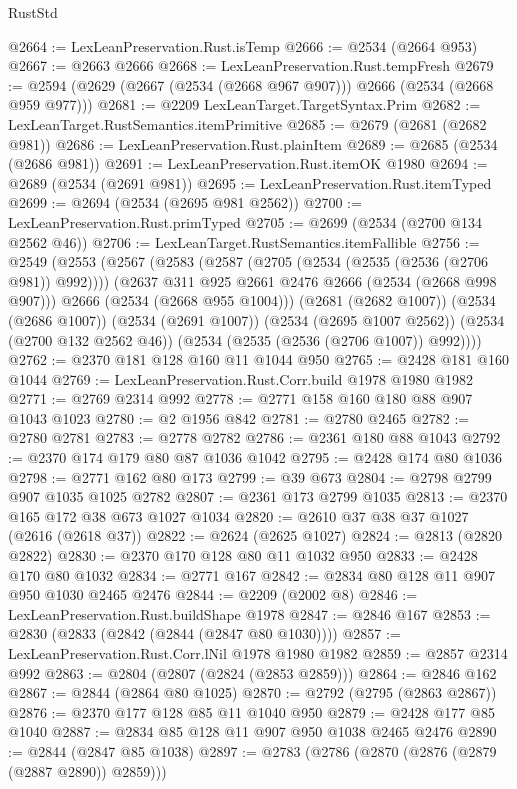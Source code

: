 \begin{lexlean}{RustStd}
\begin{coremodule}
@2664 := LexLeanPreservation.Rust.isTemp
@2666 := @2534 (@2664 @953)
@2667 := @2663 @2666
@2668 := LexLeanPreservation.Rust.tempFresh
@2679 := @2594 (@2629 (@2667 (@2534 (@2668 @967 @907))) @2666 (@2534 (@2668 @959 @977)))
@2681 := @2209 LexLeanTarget.TargetSyntax.Prim
@2682 := LexLeanTarget.RustSemantics.itemPrimitive
@2685 := @2679 (@2681 (@2682 @981))
@2686 := LexLeanPreservation.Rust.plainItem
@2689 := @2685 (@2534 (@2686 @981))
@2691 := LexLeanPreservation.Rust.itemOK @1980
@2694 := @2689 (@2534 (@2691 @981))
@2695 := LexLeanPreservation.Rust.itemTyped
@2699 := @2694 (@2534 (@2695 @981 @2562))
@2700 := LexLeanPreservation.Rust.primTyped
@2705 := @2699 (@2534 (@2700 @134 @2562 @46))
@2706 := LexLeanTarget.RustSemantics.itemFallible
@2756 := @2549
    (@2553
      (@2567
        (@2583
          (@2587 (@2705 (@2534 (@2535 (@2536 (@2706 @981)) @992))))
          (@2637 @311 @925 @2661 @2476 @2666 (@2534 (@2668 @998 @907)))
          @2666
          (@2534 (@2668 @955 @1004)))
        (@2681 (@2682 @1007))
        (@2534 (@2686 @1007))
        (@2534 (@2691 @1007))
        (@2534 (@2695 @1007 @2562))
        (@2534 (@2700 @132 @2562 @46))
        (@2534 (@2535 (@2536 (@2706 @1007)) @992))))
@2762 := @2370 @181 @128 @160 @11 @1044 @950
@2765 := @2428 @181 @160 @1044
@2769 := LexLeanPreservation.Rust.Corr.build @1978 @1980 @1982
@2771 := @2769 @2314 @992
@2778 := @2771 @158 @160 @180 @88 @907 @1043 @1023
@2780 := @2 @1956 @842
@2781 := @2780 @2465
@2782 := @2780 @2781
@2783 := @2778 @2782
@2786 := @2361 @180 @88 @1043
@2792 := @2370 @174 @179 @80 @87 @1036 @1042
@2795 := @2428 @174 @80 @1036
@2798 := @2771 @162 @80 @173
@2799 := @39 @673
@2804 := @2798 @2799 @907 @1035 @1025 @2782
@2807 := @2361 @173 @2799 @1035
@2813 := @2370 @165 @172 @38 @673 @1027 @1034
@2820 := @2610 @37 @38 @37 @1027 (@2616 (@2618 @37))
@2822 := @2624 (@2625 @1027)
@2824 := @2813 (@2820 @2822)
@2830 := @2370 @170 @128 @80 @11 @1032 @950
@2833 := @2428 @170 @80 @1032
@2834 := @2771 @167
@2842 := @2834 @80 @128 @11 @907 @950 @1030 @2465 @2476
@2844 := @2209 (@2002 @8)
@2846 := LexLeanPreservation.Rust.buildShape @1978
@2847 := @2846 @167
@2853 := @2830 (@2833 (@2842 (@2844 (@2847 @80 @1030))))
@2857 := LexLeanPreservation.Rust.Corr.lNil @1978 @1980 @1982
@2859 := @2857 @2314 @992
@2863 := @2804 (@2807 (@2824 (@2853 @2859)))
@2864 := @2846 @162
@2867 := @2844 (@2864 @80 @1025)
@2870 := @2792 (@2795 (@2863 @2867))
@2876 := @2370 @177 @128 @85 @11 @1040 @950
@2879 := @2428 @177 @85 @1040
@2887 := @2834 @85 @128 @11 @907 @950 @1038 @2465 @2476
@2890 := @2844 (@2847 @85 @1038)
@2897 := @2783 (@2786 (@2870 (@2876 (@2879 (@2887 @2890)) @2859)))

\end{coremodule}
\end{lexlean}
